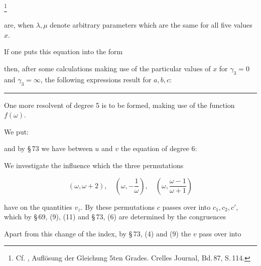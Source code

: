 %
\footnote{Cf. , Auflösung der Gleichung 5ten Grades. Crelles Journal, Bd.\,87, S.\,114.}

are, when $\lambda, \mu$ denote arbitrary parameters which are the same for all
five values $x$.

If one puts this equation into the form


then, after some calculations making use of the particular values of $x$ for
$\gamma_3=0$ and $\gamma_3=\infty$, the following expressions result for
$a, b, c$:


\par\noindent\rule{0.3\linewidth}{0.4pt}\par

One more resolvent of degree 5 is to be formed, making use of the function
$f(\omega)$.

We put:


and by §\,73 we have between $u$ and $v$ the equation of degree 6:


We investigate the influence which the three permutations

\[
(\omega, \omega+2), \quad \left(\omega, -\frac{1}{\omega}\right), \quad
\left(\omega, \frac{\omega-1}{\omega+1}\right)
\]

have on the quantities $v_z$. By these permutations $c$ passes over into
$c_1, c_2, c'$, which by §\,69, (9), (11) and §\,73, (6) are determined by the
congruences


Apart from this change of the index, by §\,73, (4) and (9) the $v$ pass over
into

